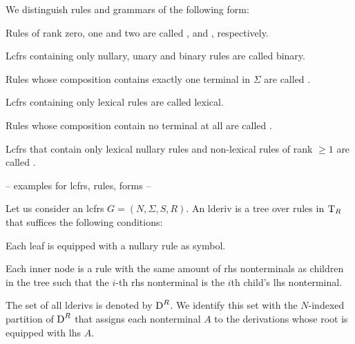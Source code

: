 \documentclass[../document.tex]{subfiles}
\begin{document}
    \begin{definition}
        We distinguish rules and grammars of the following form:
        \begin{compactitem}
            \item Rules of rank zero, one and two are called ,  and , respectively.
            \item Lcfrs containing only nullary, unary and binary rules are called \gls*{binary}.
            \item Rules whose composition contains exactly one terminal in \(\varSigma\) are called .
            \item Lcfrs containing only lexical rules are called \gls*{lexical}.
            \item Rules whose composition contain no terminal at all are called .
            \item Lcfrs that contain only lexical nullary rules and non-lexical rules of rank \(\ge 1\) are called .
        \end{compactitem}
    \end{definition}

    \begin{example}
        -- examples for lcfrs, rules, forms --
    \end{example}

    \begin{definition}[Derivation]
        Let us consider an lcfrs \(G = (N, \varSigma, S, R)\).
        An \gls{lderiv} is a tree over rules in \(\operatorname{T}_R\) that suffices the following conditions:
        \begin{compactitem}
            \item Each leaf is equipped with a nullary rule as symbol.
            \item Each inner node is a rule with the same amount of \gls{rhs} nonterminals as children in the tree such that the \(i\)-th \gls{rhs} nonterminal is the \(i\)th child's \gls{lhs} nonterminal.
        \end{compactitem}
        The set of all \glspl{lderiv} is denoted by \(\operatorname{D}^R\).
        We identify this set with the \(N\)-indexed partition of \(\operatorname{D}^R\) that assigns each nonterminal \(A\) to the derivations whose root is equipped with \gls{lhs} \(A\).
    \end{definition}
\end{document}
